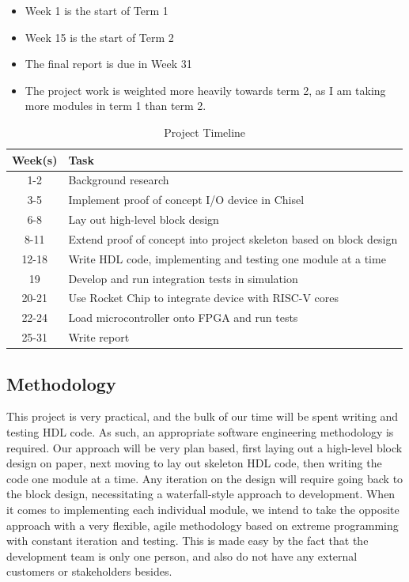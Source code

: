 \documentclass[a4paper,fleqn,12pt]{article}
\begin{document}
\begin{itemize}
	\item Week 1 is the start of Term 1
	\item Week 15 is the start of Term 2
	\item The final report is due in Week 31
	\item The project work is weighted more heavily towards term 2, as I am taking more modules in term 1 than term 2.
\end{itemize}


\begin{table}[ht!]
	\centering
	\begin{tabular}{|c|l|}
		\hline
		\textbf{Week(s)} & \textbf{Task}                                                       \\ \hline
		1-2              & Background research                                                 \\ \hline
		3-5              & Implement proof of concept I/O device in Chisel                     \\ \hline
		6-8              & Lay out high-level block design                                     \\ \hline
		8-11             & Extend proof of concept into project skeleton based on block design \\ \hline
		12-18            & Write HDL code, implementing and testing one module at a time       \\ \hline
		19               & Develop and run integration tests in simulation                     \\ \hline
		20-21            & Use Rocket Chip to integrate device with RISC-V cores               \\ \hline
		22-24            & Load microcontroller onto FPGA and run tests                        \\ \hline
		25-31            & Write report                                                        \\ \hline
	\end{tabular}
	\caption{Project Timeline}
	\label{tab:timeline}
\end{table}

\subsection{Methodology}

This project is very practical, and the bulk of our time will be spent writing and testing HDL code. As such, an appropriate software engineering methodology is required. Our approach will be very plan based, first laying out a high-level block design on paper, next moving to lay out skeleton HDL code, then writing the code one module at a time. Any iteration on the design will require going back to the block design, necessitating a waterfall-style approach to development. When it comes to implementing each individual module, we intend to take the opposite approach with a very flexible, agile methodology based on extreme programming with constant iteration and testing. This is made easy by the fact that the development team is only one person, and also do not have any external customers or stakeholders besides.
\end{document}
